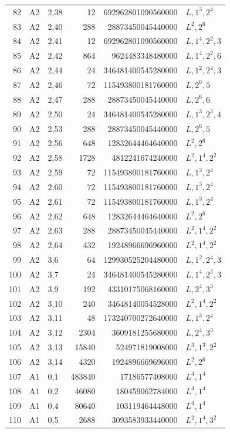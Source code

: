 \begin{longtable}{rllrrl}
82&A2&2,38&12&692962801090560000&$L,1^{3},2^{4}$\\
83&A2&2,40&288&28873450045440000&$L^{2},2^{6}$\\
84&A2&2,41&12&692962801090560000&$L,1^{4},2^{2},3$\\
85&A2&2,42&864&9624483348480000&$L,1^{4},2^{2},6$\\
86&A2&2,44&24&346481400545280000&$L,1^{2},2^{4},3$\\
87&A2&2,46&72&115493800181760000&$L,2^{6},5$\\
88&A2&2,47&288&28873450045440000&$L,2^{6},6$\\
89&A2&2,50&24&346481400545280000&$L,1^{3},2^{3},4$\\
90&A2&2,53&288&28873450045440000&$L,2^{6},5$\\
91&A2&2,56&648&12832644464640000&$L^{2},2^{6}$\\
92&A2&2,58&1728&4812241674240000&$L^{2},1^{4},2^{2}$\\
93&A2&2,59&72&115493800181760000&$L,1^{3},2^{4}$\\
94&A2&2,60&72&115493800181760000&$L,1^{3},2^{4}$\\
95&A2&2,61&72&115493800181760000&$L,1^{3},2^{4}$\\
96&A2&2,62&648&12832644464640000&$L^{2},2^{6}$\\
97&A2&2,63&288&28873450045440000&$L^{2},1^{4},2^{2}$\\
98&A2&2,64&432&19248966696960000&$L^{2},1^{4},2^{2}$\\
99&A2&3,6&64&129930525204480000&$L,1^{2},2^{4},3$\\
100&A2&3,7&24&346481400545280000&$L,1^{4},2^{2},3$\\
101&A2&3,9&192&43310175068160000&$L,2^{4},3^{3}$\\
102&A2&3,10&240&34648140054528000&$L^{2},1^{4},2^{2}$\\
103&A2&3,11&48&173240700272640000&$L,1^{3},2^{4}$\\
104&A2&3,12&2304&3609181255680000&$L,2^{4},3^{3}$\\
105&A2&3,13&15840&524971819008000&$L^{3},1^{3},2^{2}$\\
106&A2&3,14&4320&1924896669696000&$L^{2},2^{6}$\\
107&A1&0,1&483840&17186577408000&$L^{4},1^{4}$\\
108&A1&0,2&46080&180459062784000&$L^{4},1^{4}$\\
109&A1&0,4&80640&103119464448000&$L^{4},1^{4}$\\
110&A1&0,5&2688&3093583933440000&$L^{2},1^{4},3^{2}$\\

\end{longtable}
